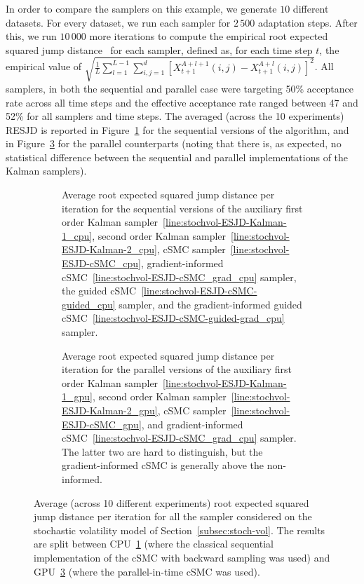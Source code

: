 In order to compare the samplers on this example, we generate $10$ different datasets. For every dataset, we run each sampler for $2\,500$ adaptation steps. After this, we run $10\,000$ more iterations to compute the empirical root expected squared jump distance~\citep[RESJD,][]{pasarica2010adaptively} for each sampler, defined as, for each time step $t$, the empirical value of $\sqrt{\frac{1}{L} \sum_{l=1}^{L-1}\sum_{i,j=1}^d\left[X^{A + l + 1}_{t+1}(i,j) - X^{A + l}_{t+1}(i,j)\right]^2}$. All samplers, in both the sequential and parallel case were targeting 50\% acceptance rate across all time steps and the effective acceptance rate ranged between 47 and 52\% for all samplers and time steps. The averaged (across the 10 experiments) RESJD is reported in Figure~\ref{fig:esjd-stoch-vol-cpu} for the sequential versions of the algorithm, and in Figure~\ref{fig:esjd-stoch-vol-gpu} for the parallel counterparts (noting that there is, as expected, no statistical difference between the sequential and parallel implementations of the Kalman samplers).
\begin{figure}[htb!]
    \centering
    \begin{subfigure}[t]{.45\textwidth}
        \centering
        \resizebox{\columnwidth}{!}{}
        \caption{Average root expected squared jump distance per iteration for the sequential versions of the auxiliary first order Kalman sampler~\ref{line:stochvol-ESJD-Kalman-1_cpu}, second order Kalman sampler~\ref{line:stochvol-ESJD-Kalman-2_cpu}, cSMC sampler~\ref{line:stochvol-ESJD-cSMC_cpu}, gradient-informed cSMC~\ref{line:stochvol-ESJD-cSMC_grad_cpu} sampler, the guided cSMC~\ref{line:stochvol-ESJD-cSMC-guided_cpu} sampler, and the gradient-informed guided cSMC~\ref{line:stochvol-ESJD-cSMC-guided-grad_cpu} sampler.}
        \label{fig:esjd-stoch-vol-cpu}
    \end{subfigure}%
    \hfill
    \begin{subfigure}[t]{.45\textwidth}
        \centering
        \resizebox{\columnwidth}{!}{}
        \caption{Average root expected squared jump distance per iteration for the parallel versions of the auxiliary first order Kalman sampler~\ref{line:stochvol-ESJD-Kalman-1_gpu}, second order Kalman sampler~\ref{line:stochvol-ESJD-Kalman-2_gpu}, cSMC sampler~\ref{line:stochvol-ESJD-cSMC_gpu}, and gradient-informed cSMC~\ref{line:stochvol-ESJD-cSMC_grad_cpu} sampler. The latter two are hard to distinguish, but the gradient-informed cSMC is generally above the non-informed.}
        \label{fig:esjd-stoch-vol-gpu}
    \end{subfigure}
    \caption{Average (across 10 different experiments) root expected squared jump distance per iteration for all the sampler considered on the stochastic volatility model of Section~\ref{subsec:stoch-vol}. The results are split between CPU~\ref{fig:esjd-stoch-vol-cpu} (where the classical sequential implementation of the cSMC with backward sampling was used) and GPU~\ref{fig:esjd-stoch-vol-gpu} (where the parallel-in-time cSMC was used).}
\end{figure}
